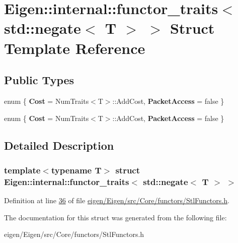 \hypertarget{struct_eigen_1_1internal_1_1functor__traits_3_01std_1_1negate_3_01_t_01_4_01_4}{}\section{Eigen\+:\+:internal\+:\+:functor\+\_\+traits$<$ std\+:\+:negate$<$ T $>$ $>$ Struct Template Reference}
\label{struct_eigen_1_1internal_1_1functor__traits_3_01std_1_1negate_3_01_t_01_4_01_4}
\subsection*{Public Types}
\begin{DoxyCompactItemize}
\item 
\mbox{\label{struct_eigen_1_1internal_1_1functor__traits_3_01std_1_1negate_3_01_t_01_4_01_4_a970340aac2ab92448a932c448bb090cc}} 
enum \{ {\bfseries Cost} = Num\+Traits$<$T$>$\+:\+:Add\+Cost, 
{\bfseries Packet\+Access} = false
 \}
\item 
\mbox{\label{struct_eigen_1_1internal_1_1functor__traits_3_01std_1_1negate_3_01_t_01_4_01_4_a1dee02b7553fe6dafaf1c93b82169373}} 
enum \{ {\bfseries Cost} = Num\+Traits$<$T$>$\+:\+:Add\+Cost, 
{\bfseries Packet\+Access} = false
 \}
\end{DoxyCompactItemize}


\subsection{Detailed Description}
\subsubsection*{template$<$typename T$>$\newline
struct Eigen\+::internal\+::functor\+\_\+traits$<$ std\+::negate$<$ T $>$ $>$}



Definition at line \hyperlink{eigen_2_eigen_2src_2_core_2functors_2_stl_functors_8h_source_l00036}{36} of file \hyperlink{eigen_2_eigen_2src_2_core_2functors_2_stl_functors_8h_source}{eigen/\+Eigen/src/\+Core/functors/\+Stl\+Functors.\+h}.



The documentation for this struct was generated from the following file\+:\begin{DoxyCompactItemize}
\item 
eigen/\+Eigen/src/\+Core/functors/\+Stl\+Functors.\+h\end{DoxyCompactItemize}
